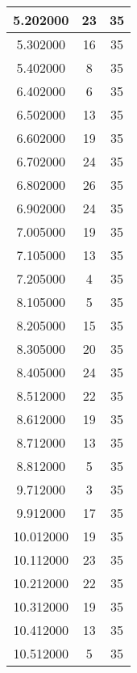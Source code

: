 \begin{longtable}[htbp]{|c|c|c|}
5.202000 & 23 & 35 \\ \hline
5.302000 & 16 & 35 \\ \hline
5.402000 & 8 & 35 \\ \hline
6.402000 & 6 & 35 \\ \hline
6.502000 & 13 & 35 \\ \hline
6.602000 & 19 & 35 \\ \hline
6.702000 & 24 & 35 \\ \hline
6.802000 & 26 & 35 \\ \hline
6.902000 & 24 & 35 \\ \hline
7.005000 & 19 & 35 \\ \hline
7.105000 & 13 & 35 \\ \hline
7.205000 & 4 & 35 \\ \hline
8.105000 & 5 & 35 \\ \hline
8.205000 & 15 & 35 \\ \hline
8.305000 & 20 & 35 \\ \hline
8.405000 & 24 & 35 \\ \hline
8.512000 & 22 & 35 \\ \hline
8.612000 & 19 & 35 \\ \hline
8.712000 & 13 & 35 \\ \hline
8.812000 & 5 & 35 \\ \hline
9.712000 & 3 & 35 \\ \hline
9.912000 & 17 & 35 \\ \hline
10.012000 & 19 & 35 \\ \hline
10.112000 & 23 & 35 \\ \hline
10.212000 & 22 & 35 \\ \hline
10.312000 & 19 & 35 \\ \hline
10.412000 & 13 & 35 \\ \hline
10.512000 & 5 & 35 \\ \hline
\end{longtable}
